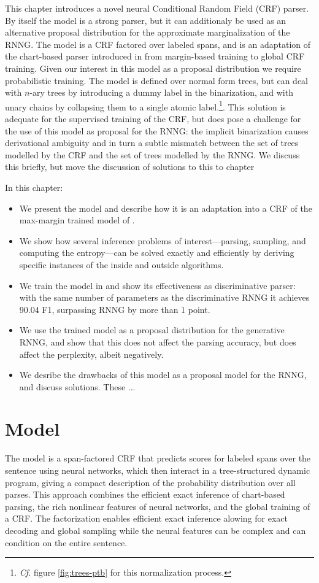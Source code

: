 This chapter introduces a novel neural Conditional Random Field (CRF) parser. By itself the model is a strong parser, but it can additionaly be used as an alternative proposal distribution for the approximate marginalization of the RNNG. The model is a CRF factored over labeled spans, and is an adaptation of the chart-based parser introduced in \citet{stern2017minimal} from margin-based training to global CRF training. Given our interest in this model as a proposal distribution we require probabilistic training. The model is defined over normal form trees, but can deal with $n$-ary trees by introducing a dummy label in the binarization, and with unary chains by collapsing them to a single atomic label.\footnote{\textit{Cf.} figure \ref{fig:trees-ptb} for this normalization process.}. This solution is adequate for the supervised training of the CRF, but does pose a challenge for the use of this model as proposal for the RNNG: the implicit binarization causes derivational ambiguity and in turn a subtle mismatch between the set of trees modelled by the CRF and the set of trees modelled by the RNNG. We discuss this briefly, but move the discussion of solutions to this to chapter

In this chapter:
\begin{itemize}
  \item We present the model and describe how it is an adaptation into a CRF of the max-margin trained model of \citet{stern2017minimal}.
  \item We show how several inference problems of interest---parsing, sampling, and computing the entropy---can be solved exactly and efficiently by deriving specific instances of the inside and outside algorithms.
  \item We train the model in and show its effectiveness as discriminative parser: with the same number of parameters as the discriminative RNNG it achieves 90.04 F1, surpassing RNNG by more than 1 point.
  \item We use the trained model as a proposal distribution for the generative RNNG, and show that this does not affect the parsing accuracy, but does affect the perplexity, albeit negatively.
  \item We desribe the drawbacks of this model as a proposal model for the RNNG, and discuss solutions. These ...
\end{itemize}

\section{Model}
   The model is a span-factored CRF that predicts scores for labeled spans over the sentence using neural networks, which then interact in a tree-structured dynamic program, giving a compact description of the probability distribution over all parses. This approach combines the efficient exact inference of chart-based parsing, the rich nonlinear features of neural networks, and the global training of a CRF. The factorization enables efficient exact inference alowing for exact decoding and global sampling while the neural features can be complex and can condition on the entire sentence.

